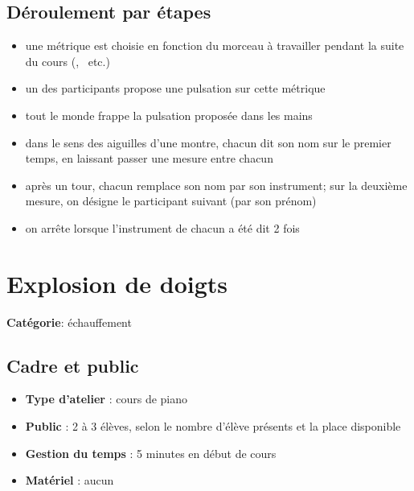 \documentclass[a4paper,11pt,bibliography=totoc,numbers=noenddot,listof=flat,DIV=11,BCOR=0mm]{scrreprt}%
\begin{document}
\section*{Déroulement par étapes}
\begin{itemize}
\item une métrique est choisie en fonction du morceau à travailler pendant la suite du cours (, ~etc.) 
\item un des participants propose une pulsation sur cette métrique
\item tout le monde frappe la pulsation proposée dans les mains
\item dans le sens des aiguilles d'une montre, chacun dit son nom sur le premier temps, en laissant passer une mesure entre chacun
\item après un tour, chacun remplace son nom par son instrument; sur la deuxième mesure, on désigne le participant suivant (par son prénom)
\item on arrête lorsque l'instrument de chacun a été dit 2 fois
\end{itemize}

\chapter[Jeu d'échauffement: Explosion de doigts]{Explosion de doigts}


{\large \textbf{Catégorie}}:
échauffement

\section*{Cadre et public}
\begin{itemize}
\item [\textbullet]\textbf{Type d'atelier} : cours de piano

\item [\textbullet]\textbf{Public} : 2 à 3 élèves, selon le nombre d'élève présents et la place disponible

\item [\textbullet]\textbf{Gestion du temps} : 5 minutes en début de cours

\item [\textbullet]\textbf{Matériel} : aucun
\end{itemize}
\end{document}
